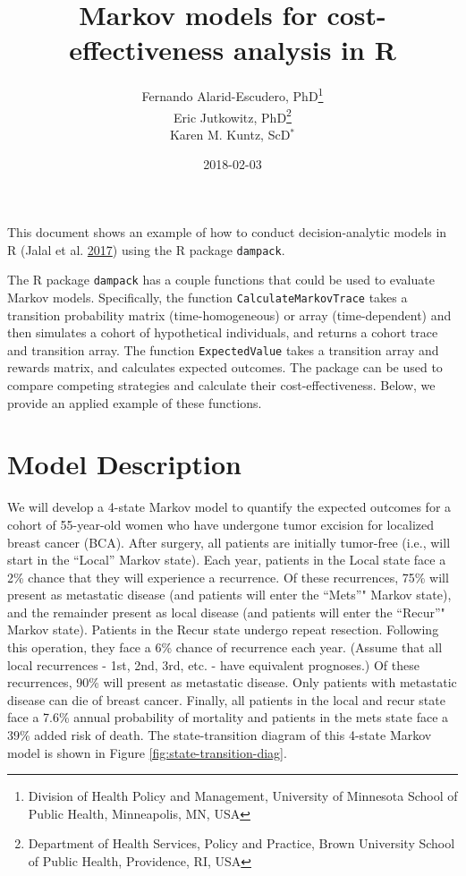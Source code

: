 \documentclass[]{article}
\title{Markov models for cost-effectiveness analysis in R}
\author{Fernando Alarid-Escudero, PhD\footnote{Division of Health Policy and
  Management, University of Minnesota School of Public Health,
  Minneapolis, MN, USA} \\ Eric Jutkowitz, PhD\footnote{Department of Health Services, Policy and
  Practice, Brown University School of Public Health, Providence, RI,
  USA} \\ Karen M. Kuntz, ScD\(^*\)}
\date{2018-02-03}
\theoremstyle{definition}
\theoremstyle{definition}
\theoremstyle{definition}
\theoremstyle{remark}
\begin{document}
\maketitle

{
\setcounter{tocdepth}{4}
\tableofcontents
}
This document shows an example of how to conduct decision-analytic
models in R (Jalal et al. \protect\hyperlink{ref-Jalal2017b}{2017})
using the R package \texttt{dampack}.

The R package \texttt{dampack} has a couple functions that could be used
to evaluate Markov models. Specifically, the function
\texttt{CalculateMarkovTrace} takes a transition probability matrix
(time-homogeneous) or array (time-dependent) and then simulates a cohort
of hypothetical individuals, and returns a cohort trace and transition
array. The function \texttt{ExpectedValue} takes a transition array and
rewards matrix, and calculates expected outcomes. The package can be
used to compare competing strategies and calculate their
cost-effectiveness. Below, we provide an applied example of these
functions.

\section{Model Description}\label{model-description}

We will develop a 4-state Markov model to quantify the expected outcomes
for a cohort of 55-year-old women who have undergone tumor excision for
localized breast cancer (BCA). After surgery, all patients are initially
tumor-free (i.e., will start in the ``Local'' Markov state). Each year,
patients in the Local state face a 2\% chance that they will experience
a recurrence. Of these recurrences, 75\% will present as metastatic
disease (and patients will enter the ``Mets''" Markov state), and the
remainder present as local disease (and patients will enter the
``Recur''" Markov state). Patients in the Recur state undergo repeat
resection. Following this operation, they face a 6\% chance of
recurrence each year. (Assume that all local recurrences - 1st, 2nd,
3rd, etc. - have equivalent prognoses.) Of these recurrences, 90\% will
present as metastatic disease. Only patients with metastatic disease can
die of breast cancer. Finally, all patients in the local and recur state
face a 7.6\% annual probability of mortality and patients in the mets
state face a 39\% added risk of death. The state-transition diagram of
this 4-state Markov model is shown in Figure
\ref{fig:state-transition-diag}.
\end{document}
